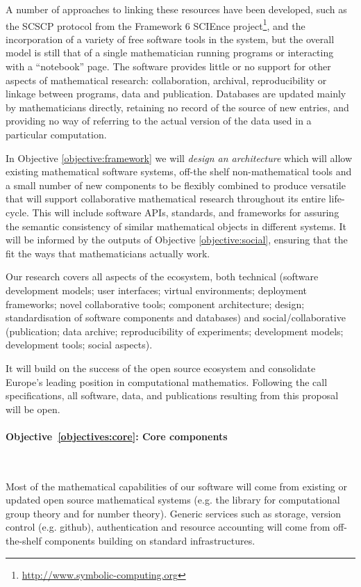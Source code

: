 \documentclass[noworkareas,deliverables,\classoptions]{euproposal}       %
\begin{document}
\begin{proposal}
A number of approaches to linking these resources have been developed,
such as the SCSCP protocol from the Framework 6 SCIEnce
project\footnote{\url{http://www.symbolic-computing.org}}, and the
incorporation of a variety of free software tools in the \Sage system,
but the overall model is still that of a single mathematician running
programs or interacting with a ``notebook'' page. The software
provides little or no support for other aspects of mathematical
research: collaboration, archival, reproducibility or linkage between
programs, data and publication. Databases are updated mainly by
mathematicians directly, retaining no record of the source of new
entries, and providing no way of referring to the actual version of
the data used in a particular computation.

In Objective \ref{objective:framework} we will \emph{design an
  architecture} which will allow existing mathematical software
systems, off-the shelf non-mathematical tools and a small number of new
components to be flexibly combined to produce versatile \VREs that will support
collaborative mathematical research throughout its entire
life-cycle. This will include software APIs, standards, and
frameworks for assuring the semantic consistency of similar
mathematical objects in different systems. It will be informed by the
outputs of Objective \ref{objective:social}, ensuring that the \VREs
fit the ways that mathematicians actually work.

Our research covers all aspects of the ecosystem, both technical
(software development models; user
    interfaces; virtual environments; deployment frameworks; novel
    collaborative tools; component architecture; design;
    standardisation of software components and databases)
and social/collaborative
(publication; data archive; reproducibility of experiments;
development models; development tools; social aspects).

It will build on the success of the open source ecosystem and
consolidate Europe's leading position in computational mathematics.
Following the call specifications, all software, data, and
publications resulting from this proposal will be open.

\paragraph{Objective~\ref{objectives:core}: Core components}\

Most of the mathematical capabilities of our software will come
from existing or updated open source mathematical systems (e.g. the
\GAP library for computational group theory and \PariGP for number
theory). Generic services such as storage, version control
(e.g. github), authentication and resource accounting will come from
off-the-shelf components building on standard infrastructures.


\end{proposal}
\end{document}
